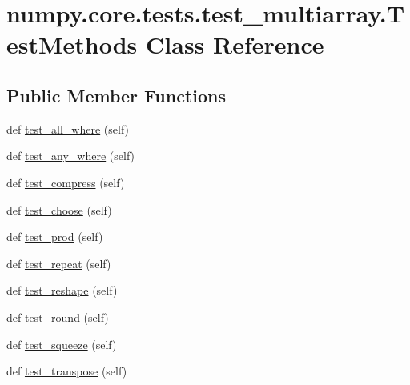 \hypertarget{classnumpy_1_1core_1_1tests_1_1test__multiarray_1_1TestMethods}{}\section{numpy.\+core.\+tests.\+test\+\_\+multiarray.\+Test\+Methods Class Reference}
\label{classnumpy_1_1core_1_1tests_1_1test__multiarray_1_1TestMethods}
\subsection*{Public Member Functions}
\begin{DoxyCompactItemize}
\item 
def \hyperlink{classnumpy_1_1core_1_1tests_1_1test__multiarray_1_1TestMethods_ac3c00ec552e77d5c1ead5f4ee771475e}{test\+\_\+all\+\_\+where} (self)
\item 
def \hyperlink{classnumpy_1_1core_1_1tests_1_1test__multiarray_1_1TestMethods_a782e6c3d2a4f2aa4efa0ebaa1d54f223}{test\+\_\+any\+\_\+where} (self)
\item 
def \hyperlink{classnumpy_1_1core_1_1tests_1_1test__multiarray_1_1TestMethods_a55c324e4befd9d8319728897e4018fd7}{test\+\_\+compress} (self)
\item 
def \hyperlink{classnumpy_1_1core_1_1tests_1_1test__multiarray_1_1TestMethods_ac15441b9a5c853c9b54e54ae9f84d832}{test\+\_\+choose} (self)
\item 
def \hyperlink{classnumpy_1_1core_1_1tests_1_1test__multiarray_1_1TestMethods_a8a64c73660a79348d985546ba5b41a47}{test\+\_\+prod} (self)
\item 
def \hyperlink{classnumpy_1_1core_1_1tests_1_1test__multiarray_1_1TestMethods_a8c92881f4d7b0147cd9523e9eb1a9e3a}{test\+\_\+repeat} (self)
\item 
def \hyperlink{classnumpy_1_1core_1_1tests_1_1test__multiarray_1_1TestMethods_ad79c3684f5ecfd0371cdcec307abd904}{test\+\_\+reshape} (self)
\item 
def \hyperlink{classnumpy_1_1core_1_1tests_1_1test__multiarray_1_1TestMethods_ab1199c12a26349007e3f4b039eb3edde}{test\+\_\+round} (self)
\item 
def \hyperlink{classnumpy_1_1core_1_1tests_1_1test__multiarray_1_1TestMethods_a8936f28ffb77ee9312cf8e377ca1cc11}{test\+\_\+squeeze} (self)
\item 
def \hyperlink{classnumpy_1_1core_1_1tests_1_1test__multiarray_1_1TestMethods_ab048261d589e3ab32e12c6f4a9880587}{test\+\_\+transpose} (self)

\end{DoxyCompactItemize}

